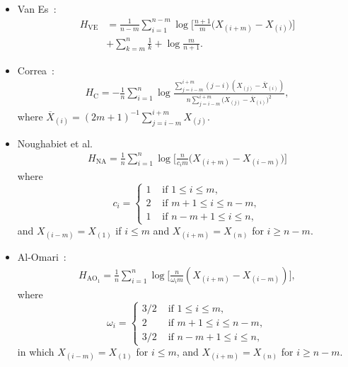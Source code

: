 \documentclass[journal]{IEEEtran}
\begin{document}
\begin{itemize}
	\item Van Es~\cite{VanEs92}:
	\begin{align}
		\label{HVE}
		H_\text{VE}&=\frac{1}{n-m} \sum_{i=1}^{n-m}\log{\Big[\frac{n+1}{m}\big(X_{(i+m)}-X_{(i)}\big)\Big]} \nonumber\\
		&+\sum_{k=m}^{n} \frac{1}{k}+\log \frac{m}{n+1}.
	\end{align}
	\item Correa~\cite{Correa95}:
	\begin{align}
		\label{HC}
		H_\text{C}=-\frac{1}{n} \sum_{i=1}^{n} \log \frac{\sum_{j=i-m}^{i+m}(j-i)\left(X_{(j)}-\overline{X}_{(i)}\right)}{n \sum_{j=i-m}^{i+m}\big(X_{(j)}-\overline{X}_{(i)}\big)^{2}},
	\end{align}
	where $\overline{X}_{(i)}=(2 m+1)^{-1} \sum_{j=i-m}^{i+m} X_{(j)}$.
	\item Noughabiet et al.~\cite{Noughabi2010} 
	\label{HNA}
	\begin{align}
		H_\text{NA}=\frac{1}{n} \sum_{i=1}^{n} \log \Big[\frac{n}{c_{i} m}\big(X_{(i+m)}-X_{(i-m)}\big)\Big]
	\end{align}
	where 
	\begin{equation*}
		c_{i}=\left\{\begin{array}{ll}
			1 & \text{ if }1 \leq i \leq m, \\
			2 & \text{ if }m+1 \leq i \leq n-m, \\
			1 & \text{ if }n-m+1 \leq i \leq n,
		\end{array}\right.
	\end{equation*}
	and $X_{(i-m)}=X_{(1)}$ if $i \leq m$ and $X_{(i+m)}=X_{(n)}$ for $i \geq n-m $. 
	\item Al-Omari~\cite{AlOmari2014}:
	\begin{align}
		H_{{\text{AO}}_1}=\frac{1}{n} \sum_{i=1}^{n} \log \Big[\frac{n}{\omega_{i} m}\left(X_{(i+m)}-X_{(i-m)}\right)\Big], 
		\label{AHE}
	\end{align}
	where
	\begin{equation*}
		\omega_{i}= \begin{cases}
			3/2 & \text{ if }1 \leq i \leq m, \\
			2 & \text{ if } m+1 \leq i \leq n-m, \\
			3/2 & \text{ if } n-m+1 \leq i \leq n,
		\end{cases}
	\end{equation*}
	in which $X_{(i-m)}=X_{(1)}$ for $i \leq m$, and $X_{(i+m)}=X_{(n)}$ for $i \geq n-m$. 
	

\end{itemize}
\end{document}
